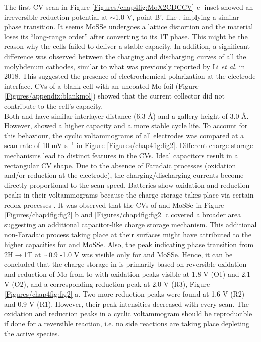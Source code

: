 The first CV scan in Figure \ref{Figures/chap4fig:MoX2CDCCV} c- inset showed an irreversible reduction potential at $\sim$1.0 V, point B', like , implying a similar phase transition. It seems MoSSe undergoes a lattice distortion and the material loses its \enquote{long-range order} after converting to its 1T phase. This might be the reason why the cells failed to deliver a stable capacity. In addition, a significant difference was observed between the charging and discharging curves of all the molybdenum cathodes, similar to what was previously reported by Li \textit{et al.} in 2018. This suggested the presence of electrochemical polarization at the electrode interface. %
CVs of a blank cell with an uncoated Mo foil (Figure \ref{Figures/appendix:blankmol}) showed that the current collector did not contribute to the cell's capacity. \\
Both  and  have similar interlayer distance (6.3 \AA) and a gallery height of 3.0 \AA. However,  showed a higher capacity and a more stable cycle life. To account for this behaviour, the cyclic voltammograms of all electrodes was compared at a scan rate of 10 mV s$^{-1}$ in Figure \ref{Figures/chap4fig:fig2}. Different charge-storage mechanisms lead to distinct features in the CVs. Ideal capacitors result in a rectangular CV shape. Due to the absence of Faradaic processes (oxidation and/or reduction at the electrode), the charging/discharging currents become directly proportional to the scan speed. Batteries show oxidation and reduction peaks in their voltammograms because the charge storage takes place via certain redox processes \cite{jiao_aluminum-ion_2016}. It was observed that the CVs of  and MoSSe in Figure \ref{Figures/chap4fig:fig2} b and \ref{Figures/chap4fig:fig2} c covered a broader area suggesting an additional capacitor-like charge storage mechanism. This additional non-Faradaic process taking place at their surfaces might have attributed to the higher capacities for  and  MoSSe. Also, the peak indicating phase transition from 2H$\rightarrow$1T at $\sim$0.9 -1.0 V was visible only for  and MoSSe. Hence, it can be concluded that the charge storage in  is primarily based on reversible oxidation and reduction of Mo from  to  with oxidation peaks visible at 1.8 V (O1) and 2.1 V (O2), and a corresponding reduction peak at 2.0 V (R3), Figure \ref{Figures/chap4fig:fig2} a. Two more reduction peaks were found at 1.6 V (R2) and 0.9 V (R1). However, their peak intensities decreased with every scan. The oxidation and reduction peaks in a cyclic voltammogram should be reproducible if done for a reversible reaction, i.e. no side reactions are taking place depleting the active species.\\
